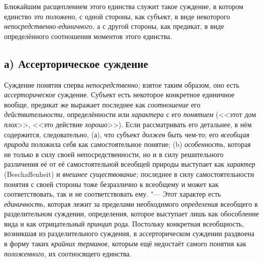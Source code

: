 Ближайшим расщеплением этого единства служит такое суждение, в
котором единство это положено, с одной стороны, как субъект, в виде
некоторого
{\em непосредственно-единичного,}
а с другой стороны, как предикат, в виде определённого
соотношения моментов этого единства.

\subsection[а) Ассерторическое суждение]{а) Ассерторическое суждение}

Суждение понятия сперва
{\em непосредственно;}
взятое таким образом, оно есть
{\em ассерторическое}
суждение. Субъект есть некоторое конкретное единичное вообще,
предикат же выражает последнее как
{\em соотношение} его
{\em действительности,}
определённости или
{\em характера} с его
{\em понятием} (<<этот дом
{\em плох}>>, <<это
действие {\em хорошо}>>).
Если рассматривать его детальнее, в нём содержится,
следовательно, (а), что субъект
{\em должен} быть чем-то;
его {\em всеобщая природа}
положила себя как самостоятельное понятие; (b)
{\em особенность,}
которая не только в силу своей непосредственности, но и в
силу решительного различения её от её самостоятельной всеобщей природы
выступает как {\em характер}
(Beschaf\-fenheit) и
{\em внешнее существование;}
последнее в силу самостоятельности понятия с своей стороны
тоже безразлично к всеобщему и может как соответствовать, так и не
соответствовать ему. "--- Этот характер есть
{\em единичность,}
которая лежит за пределами необходимого
{\em определения}
всеобщего в разделительном суждении, определения, которое
выступает лишь как обособление вида и как отрицательный
{\em принцип} рода.
Постольку конкретная всеобщность, возникшая из разделительного суждения, в
ассерторическом суждении раздвоена в форму таких
{\em крайних терминов,}
которым ещё недостаёт самого понятия как
{\em положенного,} их
соотносящего
единства.


